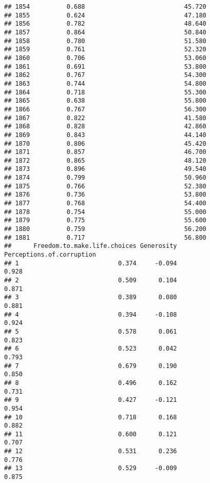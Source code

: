 \documentclass[
]{article}
\begin{document}
\begin{verbatim}
## 1854          0.688                           45.720
## 1855          0.624                           47.180
## 1856          0.782                           48.640
## 1857          0.864                           50.840
## 1858          0.780                           51.580
## 1859          0.761                           52.320
## 1860          0.706                           53.060
## 1861          0.691                           53.800
## 1862          0.767                           54.300
## 1863          0.744                           54.800
## 1864          0.718                           55.300
## 1865          0.638                           55.800
## 1866          0.767                           56.300
## 1867          0.822                           41.580
## 1868          0.828                           42.860
## 1869          0.843                           44.140
## 1870          0.806                           45.420
## 1871          0.857                           46.700
## 1872          0.865                           48.120
## 1873          0.896                           49.540
## 1874          0.799                           50.960
## 1875          0.766                           52.380
## 1876          0.736                           53.800
## 1877          0.768                           54.400
## 1878          0.754                           55.000
## 1879          0.775                           55.600
## 1880          0.759                           56.200
## 1881          0.717                           56.800
##      Freedom.to.make.life.choices Generosity Perceptions.of.corruption
## 1                           0.374     -0.094                     0.928
## 2                           0.509      0.104                     0.871
## 3                           0.389      0.080                     0.881
## 4                           0.394     -0.108                     0.924
## 5                           0.578      0.061                     0.823
## 6                           0.523      0.042                     0.793
## 7                           0.679      0.190                     0.850
## 8                           0.496      0.162                     0.731
## 9                           0.427     -0.121                     0.954
## 10                          0.718      0.168                     0.882
## 11                          0.600      0.121                     0.707
## 12                          0.531      0.236                     0.776
## 13                          0.529     -0.009                     0.875

\end{verbatim}
\end{document}

